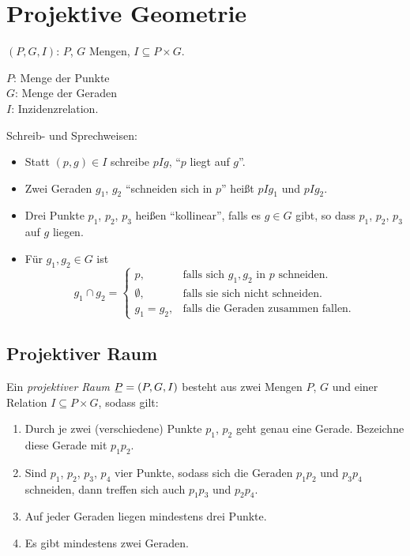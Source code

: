 \setcounter{secnumdepth}{1}
\section{Projektive Geometrie}
\setcounter{secnumdepth}{0}
$(P,G,I)$: $P$, $G$ Mengen, $I \subseteq P \times G$.

$P$: Menge der Punkte \\
$G$: Menge der Geraden \\
$I$: Inzidenzrelation.

Schreib- und Sprechweisen:
\begin{itemize}
 \item Statt $(p,g) \in I$ schreibe $pIg$, ``$p$ liegt auf $g$''. 
 \item Zwei Geraden $g_1$, $g_2$ ``schneiden sich in $p$'' heißt $pIg_1$ und $pIg_2$. 
 \item Drei Punkte $p_1$, $p_2$, $p_3$ heißen ``kollinear'', falls es $g \in G$ gibt, so dass $p_1$, $p_2$, $p_3$ auf $g$ liegen.
 \item Für $g_1, g_2 \in G$ ist
  \[ g_1 \cap g_2 = \begin{cases}
                   p, &\text{falls sich } g_1, g_2 \text{ in } p \text{ schneiden.} \\
                   \emptyset, &\text{falls sie sich nicht schneiden.} \\
                   g_1 = g_2, &\text{falls die Geraden zusammen fallen.}
                  \end{cases} \]
\end{itemize}

\subsection{Projektiver Raum}
\begin{defn*}\label{def:proj}
 Ein \emph{projektiver Raum} $\proj = (P,G,I)$ besteht aus zwei Mengen $P$, $G$ und einer Relation $I \subseteq P \times G$, sodass gilt:
 \begin{enumerate}[\hspace{.5cm}{A}1)]
  \item Durch je zwei (verschiedene) Punkte $p_1$, $p_2$ geht genau eine Gerade. Bezeichne diese Gerade mit $p_1 p_2$.
  \item Sind $p_1$, $p_2$, $p_3$, $p_4$ vier Punkte, sodass sich die Geraden $p_1 p_2$ und $p_3 p_4$ schneiden, dann treffen sich auch $p_1 p_3$ und $p_2 p_4$.
  \item Auf jeder Geraden liegen mindestens drei Punkte.
  \item Es gibt mindestens zwei Geraden.
 \end{enumerate}
\end{defn*}

